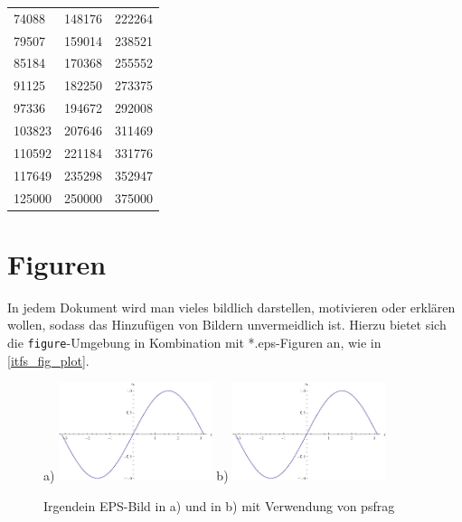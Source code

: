 \begin{center}
\begin{longtable}{l|l|l}
 74088 & 148176 & 222264 \\
 79507 & 159014 & 238521 \\
 85184 & 170368 & 255552 \\
 91125 & 182250 & 273375 \\
 97336 & 194672 & 292008 \\
 103823 & 207646 & 311469 \\
 110592 & 221184 & 331776 \\
 117649 & 235298 & 352947 \\
 125000 & 250000 & 375000 \\
\end{longtable}
\end{center}


\section{Figuren}

In jedem Dokument wird man vieles bildlich darstellen, motivieren oder erklären wollen, sodass das Hinzufügen von Bildern unvermeidlich ist. Hierzu bietet sich die \verb=figure=-Umgebung in Kombination mit *.eps-Figuren an, wie in \autoref{itfs_fig_plot}.

\begin{figure}[!ht]
	\centering
	a) \includegraphics[width=0.4\textwidth]{pics/plot.eps} \quad
	b) \includegraphics[width=0.4\textwidth]{pics/plot.eps}
	\caption{Irgendein EPS-Bild in a) und in b) mit Verwendung von psfrag}
	\label{itfs_fig_plot}
\end{figure}

